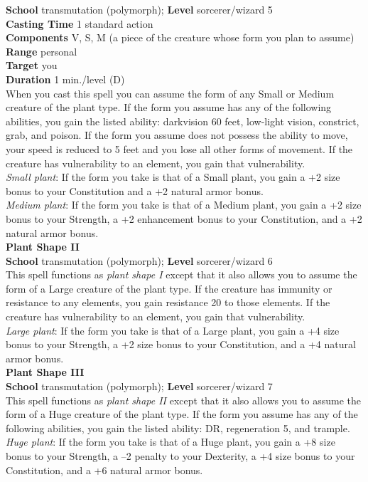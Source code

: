 \textbf{School }transmutation (polymorph); \textbf{Level }sorcerer/wizard 5\\
\textbf{Casting Time }1 standard action\\
\textbf{Components }V, S, M (a piece of the creature whose form you plan to assume)\\
\textbf{Range }personal\\
\textbf{Target }you\\
\textbf{Duration }1 min./level (D)\\
When you cast this spell you can assume the form of any Small or Medium creature of the plant type. If the form you assume has any of the following abilities, you gain the listed ability: darkvision 60 feet, low-light vision, constrict, grab, and poison. If the form you assume does not possess the ability to move, your speed is reduced to 5 feet and you lose all other forms of movement. If the creature has vulnerability to an element, you gain that vulnerability.\\
\textit{Small plant}: If the form you take is that of a Small plant, you gain a +2 size bonus to your Constitution and a +2 natural armor bonus.\\
\textit{Medium plant}: If the form you take is that of a Medium plant, you gain a +2 size bonus to your Strength, a +2 enhancement bonus to your Constitution, and a +2 natural armor bonus.\\
\textbf{Plant Shape II}\\
\textbf{School }transmutation (polymorph); \textbf{Level }sorcerer/wizard 6\\
This spell functions as \textit{plant shape I} except that it also allows you to assume the form of a Large creature of the plant type. If the creature has immunity or resistance to any elements, you gain resistance 20 to those elements. If the creature has vulnerability to an element, you gain that vulnerability.\\
\textit{Large plant}: If the form you take is that of a Large plant, you gain a +4 size bonus to your Strength, a +2 size bonus to your Constitution, and a +4 natural armor bonus.\\
\textbf{Plant Shape III}\\
\textbf{School }transmutation (polymorph); \textbf{Level }sorcerer/wizard 7\\
This spell functions as \textit{plant shape II} except that it also allows you to assume the form of a Huge creature of the plant type. If the form you assume has any of the following abilities, you gain the listed ability: DR, regeneration 5, and trample. \\
\textit{Huge plant}: If the form you take is that of a Huge plant, you gain a +8 size bonus to your Strength, a --2 penalty to your Dexterity, a +4 size bonus to your Constitution, and a +6 natural armor bonus.\\

